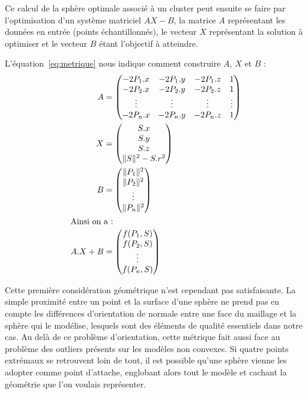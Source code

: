 \documentclass[10pt,a4paper,twoside, twocolumn]{report}
\begin{document}
Ce calcul de la sphère optimale associé à un cluster peut ensuite se faire par l'optimisation d'un système matriciel $AX-B$, la matrice $A$ représentant les données en entrée (points échantillonnés), le vecteur $X$ représentant la solution à optimiser et le vecteur $B$ étant l'objectif à atteindre.

L'équation~\ref{eq:metrique} nous indique comment construire $A$, $X$ et $B$ :
\begin{subequations}
\begin{align}
		A	&=	\begin{pmatrix}
						-2P_1.x & -2P_1.y & -2P_1.z & 1 			\\
						-2P_2.x & -2P_2.y & -2P_2.z & 1 			\\
						\vdots	& \vdots	&	\vdots	& \vdots	\\
						-2P_n.x & -2P_n.y & -2P_n.z & 1
					\end{pmatrix}																												\\
		X &=	\begin{pmatrix} S.x \\ S.y \\ S.z \\ \|S\|^2 - S.r^2 \end{pmatrix}	\\
		B	&=	\begin{pmatrix}
						\|P_1\|^2	\\
						\|P_2\|^2	\\
						\vdots			\\
						\|P_n\|^2
					\end{pmatrix}																												\\
\intertext{Ainsi on a :}
	A.X+B &= \begin{pmatrix}
						f(P_1, S)	\\
						f(P_2, S)	\\
						\vdots		\\
						f(P_n, S)
					\end{pmatrix}
\end{align}
\end{subequations}

Cette première considération géométrique n'est cependant pas satisfaisante. La simple proximité entre un point et la surface d'une sphère ne prend pas en compte les différences d'orientation de normale entre une face du maillage et la sphère qui le modélise, lesquels sont des éléments de qualité essentiels dans notre cas. Au delà de ce problème d'orientation, cette métrique fait aussi face au problème des outliers présents sur les modèles non convexes. Si quatre points extrémaux se retrouvent loin de tout, il est possible qu'une sphère vienne les adopter comme point d'attache, englobant alors tout le modèle et cachant la géométrie que l'on voulais représenter.
\end{document}

